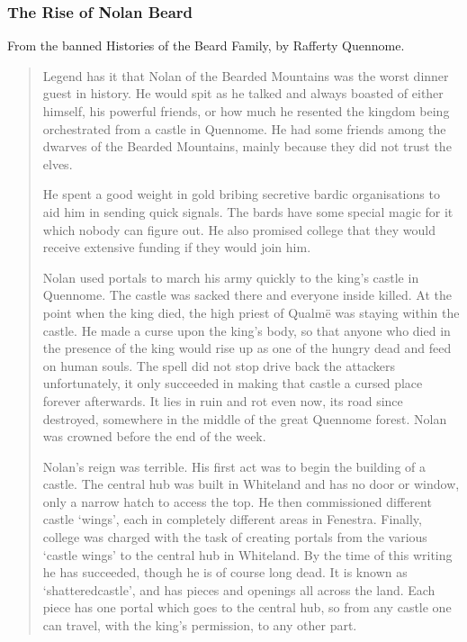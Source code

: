 \begin{multicols}{2}
\begin{quotation}
	\end{quotation}

\subsubsection{The Rise of Nolan Beard}

From the banned Histories of the Beard Family, by Rafferty Quennome.

\begin{quotation}

	Legend has it that Nolan of the Bearded Mountains was the worst dinner guest in history.
	He would spit as he talked and always boasted of either himself, his powerful friends, or how much he resented the kingdom being orchestrated from a castle in Quennome.
	He had some friends among the dwarves of the Bearded Mountains, mainly because they did not trust the elves.

	He spent a good weight in gold bribing secretive bardic organisations to aid him in sending quick signals.
	The bards have some special magic for it which nobody can figure out.
	He also promised \gls{college} that they would receive extensive funding if they would join him.

	Nolan used portals to march his army quickly to the king's castle in Quennome.
	The castle was sacked there and everyone inside killed.
	At the point when the king died, the high priest of Qualm\"{e} was staying within the castle.
	He made a curse upon the king's body, so that anyone who died in the presence of the king would rise up as one of the hungry dead and feed on human souls.
	The spell did not stop drive back the attackers unfortunately, it only succeeded in making that castle a cursed place forever afterwards.
	It lies in ruin and rot even now, its road since destroyed, somewhere in the middle of the great Quennome forest.
	Nolan was crowned before the end of the week.

	Nolan's reign was terrible.
	His first act was to begin the building of a castle.
	The central hub was built in Whiteland and has no door or window, only a narrow hatch to access the top.
	He then commissioned different castle `wings', each in completely different areas in Fenestra.
	Finally, \gls{college} was charged with the task of creating portals from the various `castle wings' to the central hub in Whiteland.
	By the time of this writing he has succeeded, though he is of course long dead.
	It is known as `\Gls{shatteredcastle}', and has pieces and openings all across the land.
	Each piece has one portal which goes to the central hub, so from any castle one can travel, with the king's permission, to any other part.


\end{quotation}
\end{multicols}
